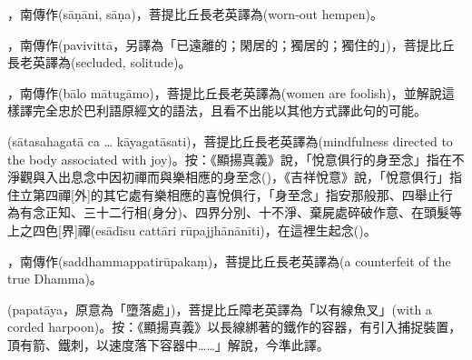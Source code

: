 \startitemgroup[noteitems]
\item{}，南傳作(sāṇāni, sāṇa)，菩提比丘長老英譯為(worn-out hempen)。
\stopitemgroup

\startitemgroup[noteitems]
\item{}，南傳作(pavivittā，另譯為「已遠離的；閑居的；獨居的；獨住的」)，菩提比丘長老英譯為(secluded, solitude)。
\stopitemgroup

\startitemgroup[noteitems]
\item{}，南傳作(bālo mātugāmo)，菩提比丘長老英譯為(women are foolish)，並解說這樣譯完全忠於巴利語原經文的語法，且看不出能以其他方式譯此句的可能。
\stopitemgroup

\startitemgroup[noteitems]
\item{}(sātasahagatā ca … kāyagatāsati)，菩提比丘長老英譯為(mindfulness directed to the body associated with joy)。按：《顯揚真義》說，「悅意俱行的身至念」指在不淨觀與入出息念中因初禪而與樂相應的身至念()，《吉祥悅意》說，「悅意俱行」指住立第四禪[外]的其它處有樂相應的喜悅俱行，「身至念」指安那般那、四舉止行為有念正知、三十二行相(身分)、四界分別、十不淨、棄屍處碎破作意、在頭髮等上之四色[界]禪(esādīsu cattāri rūpajjhānānīti)，在這裡生起念()。
\stopitemgroup

\startitemgroup[noteitems]
\item{}，南傳作(saddhammappatirūpakaṃ)，菩提比丘長老英譯為(a counterfeit of the true Dhamma)。
\stopitemgroup

\startitemgroup[noteitems]
\item{}(papatāya，原意為「墮落處」)，菩提比丘障老英譯為「以有線魚叉」(with a corded harpoon)。按：《顯揚真義》以長線綁著的鐵作的容器，有引入捕捉裝置，頂有箭、鐵刺，以速度落下容器中……」解說，今準此譯。
\stopitemgroup

